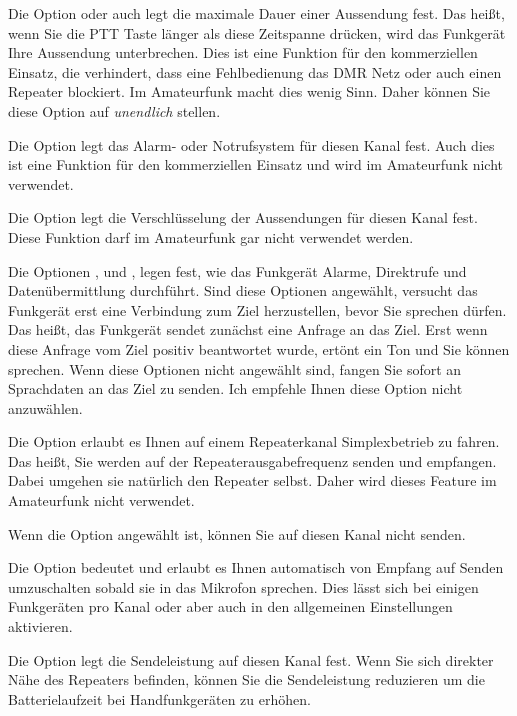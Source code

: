 Die Option  oder auch  legt die maximale Dauer einer Aussendung fest. Das heißt, wenn Sie die PTT Taste länger als diese Zeitspanne drücken, wird das Funkgerät Ihre Aussendung unterbrechen. Dies ist eine Funktion für den kommerziellen Einsatz, die verhindert, dass eine Fehlbedienung das DMR Netz oder auch einen Repeater blockiert. Im Amateurfunk macht dies wenig Sinn. Daher können Sie diese Option auf \emph{unendlich} stellen.

Die Option  legt das Alarm- oder Notrufsystem für diesen Kanal fest. Auch dies ist eine Funktion für den kommerziellen Einsatz und wird im Amateurfunk nicht verwendet.

Die Option  legt die Verschlüsselung der Aussendungen für diesen Kanal fest. Diese Funktion darf im Amateurfunk gar nicht verwendet werden.

Die Optionen ,  und , legen fest, wie das Funkgerät Alarme, Direktrufe und Datenübermittlung durchführt. Sind diese Optionen angewählt, versucht das Funkgerät erst eine Verbindung zum Ziel herzustellen, bevor Sie sprechen dürfen. Das heißt, das Funkgerät sendet zunächst eine Anfrage an das Ziel. Erst wenn diese Anfrage vom Ziel positiv beantwortet wurde, ertönt ein Ton und Sie können sprechen. Wenn diese Optionen nicht angewählt sind, fangen Sie sofort an Sprachdaten an das Ziel zu senden. Ich empfehle Ihnen diese Option nicht anzuwählen.

Die Option  erlaubt es Ihnen auf einem Repeaterkanal Simplexbetrieb zu fahren. Das heißt, Sie werden auf der Repeaterausgabefrequenz senden und empfangen. Dabei umgehen sie natürlich den Repeater selbst. Daher wird dieses Feature im Amateurfunk nicht verwendet.

Wenn die Option  angewählt ist, können Sie auf diesen Kanal nicht senden.

Die Option  bedeutet  und erlaubt es Ihnen automatisch von Empfang auf Senden umzuschalten sobald sie in das Mikrofon sprechen. Dies lässt sich bei einigen Funkgeräten pro Kanal oder aber auch in den allgemeinen Einstellungen aktivieren.

Die Option  legt die Sendeleistung auf diesen Kanal fest. Wenn Sie sich direkter Nähe des Repeaters befinden, können Sie die Sendeleistung reduzieren um die Batterielaufzeit bei Handfunkgeräten zu erhöhen. 

